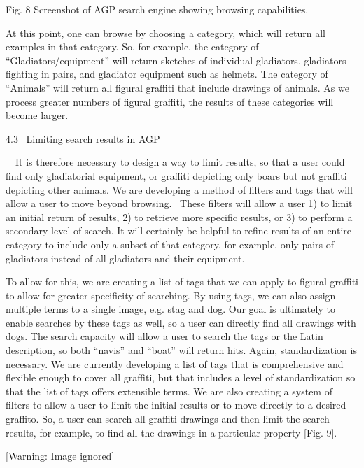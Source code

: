 \documentclass[amsthm,ebook]{saparticle}
\begin{document}
Fig. 8 Screenshot of AGP search engine showing browsing capabilities.


\bigskip

At this point, one can browse by choosing a category, which will return all examples in that category. So, for example,
the category of “Gladiators/equipment” will return sketches of individual gladiators, gladiators fighting in pairs, and
gladiator equipment such as helmets. The category of “Animals” will return all figural graffiti that include drawings
of animals. As we process greater numbers of figural graffiti, the results of these categories will become larger.


\bigskip

4.3 \ Limiting search results in AGP

\ \ It is therefore necessary to design a way to limit results, so that a user could find only gladiatorial equipment,
or graffiti depicting only boars but not graffiti depicting other animals. We are developing a method of filters and
tags that will allow a user to move beyond browsing. \ These filters will allow a user 1) to limit an initial return of
results, 2) to retrieve more specific results, or 3) to perform a secondary level of search. It will certainly be
helpful to refine results of an entire category to include only a subset of that category, for example, only pairs of
gladiators instead of all gladiators and their equipment.

To allow for this, we are creating a list of tags that we can apply to figural graffiti to allow for greater specificity
of searching. By using tags, we can also assign multiple terms to a single image, e.g. stag and dog. Our goal is
ultimately to enable searches by these tags as well, so a user can directly find all drawings with dogs. The search
capacity will allow a user to search the tags or the Latin description, so both “navis” and “boat” will return hits.
Again, standardization is necessary. We are currently developing a list of tags that is comprehensive and flexible
enough to cover all graffiti, but that includes a level of standardization so that the list of tags offers extensible
terms. We are also creating a system of filters to allow a user to limit the initial results or to move directly to a
desired graffito. So, a user can search all graffiti drawings and then limit the search results, for example, to find
all the drawings in a particular property [Fig. 9].


\bigskip

  [Warning: Image ignored] %
 
\end{document}
